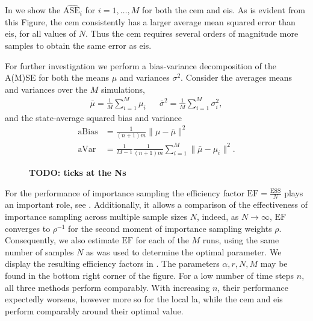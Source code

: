In  we show the $\widehat{\text{ASE}_{i}}$ for $i=1, \dots, M$ for both the \gls{cem} and \gls{eis}. As is evident from this Figure, the \gls{cem} consistently has a larger average mean squared error than \gls{eis}, for all values of $N$. Thus the \gls{cem} requires several orders of magnitude more samples to obtain the same error as \gls{eis}.

For further investigation we perform a bias-variance decomposition of the A(M)SE for both the means $\mu$ and variances $\sigma^{2}$. Consider the averages means and variances over the $M$ simulations,
\begin{align*}
    \bar \mu = \frac{1}{M} \sum_{i=1}^{M} \mu_{i} && \bar \sigma^{2} = \frac{1}{M} \sum_{i=1}^{M} \sigma^{2}_{i},
\end{align*}
and the state-average squared bias and variance
\begin{align*}
    \text{aBias} &= \frac{1}{(n+1)m} \lVert \mu - \bar\mu \rVert^{2} \\
    \text{aVar} &= \frac{1}{M - 1}\frac{1}{(n+1)m} \sum_{i=1}^M \lVert \bar\mu - \mu_{i} \rVert^{2}.
\end{align*}


\begin{figure}
    \resizebox{\textwidth}{!}{%
        
    }
    \caption{\textbf{TODO: ticks at the Ns}}
    \label{fig:mse_bias_var_decomposition}
\end{figure}


For the performance of importance sampling the efficiency factor $ \text{EF} = \frac{\text{ESS}}{N}$ plays an important role, see . Additionally, it allows a comparison of the effectiveness of importance sampling across multiple sample sizes $N$, indeed, as $N\to\infty$, $\text{EF}$ converges to $ \rho^{-1}$ for the second moment of importance sampling weights $\rho$.
Consequently, we also estimate $\text{EF}$ for each of the $M$ runs, using the same number of samples $N$ as was used to determine the optimal parameter.
We display the resulting efficiency factors in . The parameters $\alpha, r, N, M$ may be found in the bottom right corner of the figure.
For a low number of time steps $n$, all three methods perform comparably. With increasing $n$, their performance expectedly worsens, however more so for the local \gls{la}, while the \gls{cem} and \gls{eis} perform comparably around their optimal value. 

